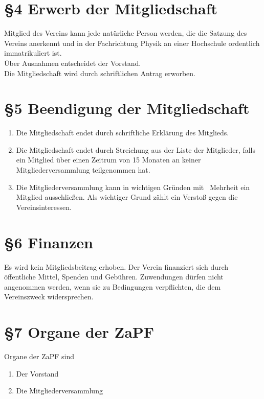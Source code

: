 \documentclass[ngerman]{article}
\begin{document}
\section*{§4 Erwerb der Mitgliedschaft}
Mitglied des Vereins kann jede natürliche Person werden, die die Satzung des Vereins anerkennt und in der Fachrichtung Physik an einer Hochschule ordentlich immatrikuliert ist.\\
Über Ausnahmen entscheidet der Vorstand.\\
Die Mitgliedschaft wird durch schriftlichen Antrag erworben.


\section*{§5 Beendigung der Mitgliedschaft}
\begin{enumerate}
 \item Die Mitgliedschaft endet durch schriftliche Erklärung des Mitglieds.
 \item Die Mitgliedschaft endet durch Streichung aus der Liste der Mitglieder, falls ein Mitglied über einen Zeitrum von 15 Monaten an keiner Mitgliederversammlung teilgenommen hat.
 \item Die Mitgliederversammlung kann in wichtigen Gründen mit \textthreequarters\ Mehrheit ein Mitglied ausschließen. Als wichtiger Grund zählt ein Verstoß gegen die Vereinsinteressen.
\end{enumerate}


\section*{§6 Finanzen}
Es wird kein Mitgliedsbeitrag erhoben. Der Verein finanziert sich durch öffentliche Mittel, Spenden und Gebühren. Zuwendungen dürfen nicht angenommen werden, wenn sie zu Bedingungen verpflichten, die dem Vereinszweck widersprechen.


\section*{§7 Organe der ZaPF}
Organe der ZaPF sind
\begin{enumerate}
 \item Der Vorstand
 \item Die Mitgliederversammlung
\end{enumerate}
\end{document}
